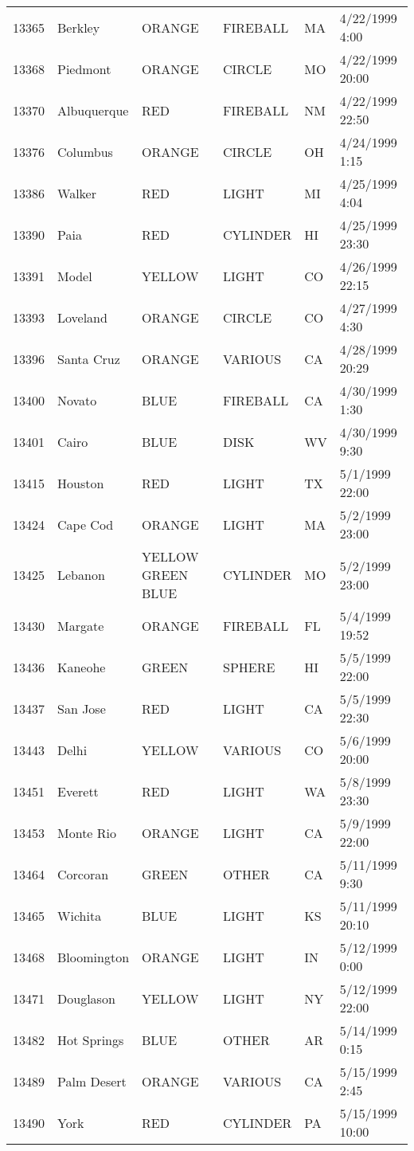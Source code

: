 \begin{tabular}{llllll}
13365 & Berkley & ORANGE & FIREBALL & MA & 4/22/1999 4:00 \\
13368 & Piedmont & ORANGE & CIRCLE & MO & 4/22/1999 20:00 \\
13370 & Albuquerque & RED & FIREBALL & NM & 4/22/1999 22:50 \\
13376 & Columbus & ORANGE & CIRCLE & OH & 4/24/1999 1:15 \\
13386 & Walker & RED & LIGHT & MI & 4/25/1999 4:04 \\
13390 & Paia & RED & CYLINDER & HI & 4/25/1999 23:30 \\
13391 & Model & YELLOW & LIGHT & CO & 4/26/1999 22:15 \\
13393 & Loveland & ORANGE & CIRCLE & CO & 4/27/1999 4:30 \\
13396 & Santa Cruz & ORANGE & VARIOUS & CA & 4/28/1999 20:29 \\
13400 & Novato & BLUE & FIREBALL & CA & 4/30/1999 1:30 \\
13401 & Cairo & BLUE & DISK & WV & 4/30/1999 9:30 \\
13415 & Houston & RED & LIGHT & TX & 5/1/1999 22:00 \\
13424 & Cape Cod & ORANGE & LIGHT & MA & 5/2/1999 23:00 \\
13425 & Lebanon & YELLOW GREEN BLUE & CYLINDER & MO & 5/2/1999 23:00 \\
13430 & Margate & ORANGE & FIREBALL & FL & 5/4/1999 19:52 \\
13436 & Kaneohe & GREEN & SPHERE & HI & 5/5/1999 22:00 \\
13437 & San Jose & RED & LIGHT & CA & 5/5/1999 22:30 \\
13443 & Delhi & YELLOW & VARIOUS & CO & 5/6/1999 20:00 \\
13451 & Everett & RED & LIGHT & WA & 5/8/1999 23:30 \\
13453 & Monte Rio & ORANGE & LIGHT & CA & 5/9/1999 22:00 \\
13464 & Corcoran & GREEN & OTHER & CA & 5/11/1999 9:30 \\
13465 & Wichita & BLUE & LIGHT & KS & 5/11/1999 20:10 \\
13468 & Bloomington & ORANGE & LIGHT & IN & 5/12/1999 0:00 \\
13471 & Douglason & YELLOW & LIGHT & NY & 5/12/1999 22:00 \\
13482 & Hot Springs & BLUE & OTHER & AR & 5/14/1999 0:15 \\
13489 & Palm Desert & ORANGE & VARIOUS & CA & 5/15/1999 2:45 \\
13490 & York & RED & CYLINDER & PA & 5/15/1999 10:00 \\

\end{tabular}
